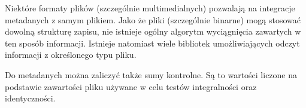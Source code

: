 \par
Niektóre formaty plików (szczególnie multimedialnych) pozwalają na integracje metadanych z samym plikiem. Jako że pliki (szczególnie binarne) mogą stosować dowolną strukturę zapisu, nie istnieje ogólny algorytm wyciągnięcia zawartych w ten sposób informacji. Istnieje natomiast wiele bibliotek umożliwiających odczyt informacji z określonego typu pliku.

\par
Do metadanych można zaliczyć także sumy kontrolne. Są to wartości liczone na podstawie zawartości pliku używane w celu testów integralności oraz identyczności.

\clearpage
